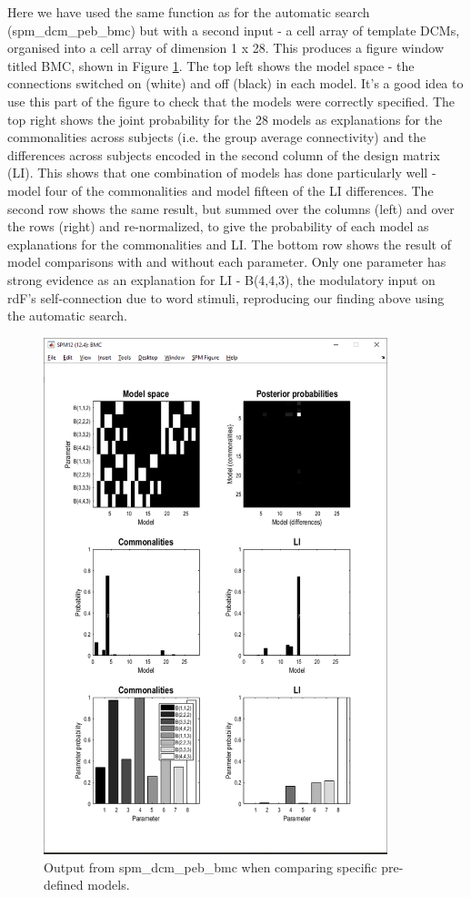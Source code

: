 \documentclass{article}
\begin{document}
Here we have used the same function as for the automatic search (spm\_dcm\_peb\_bmc) but with a second input - a cell array of template DCMs, organised into a cell array of dimension 1 x 28. This produces a figure window titled BMC, shown in Figure \ref{Fig_peb_specific_models_bmc}. The top left shows the model space - the connections switched on (white) and off (black) in each model. It's a good idea to use this part of the figure to check that the models were correctly specified. The top right shows the joint probability for the 28 models as explanations for the commonalities across subjects (i.e. the group average connectivity) and the differences across subjects encoded in the second column of the design matrix (LI). This shows that one combination of models has done particularly well - model four of the commonalities and model fifteen of the LI differences. The second row shows the same result, but summed over the columns (left) and over the rows (right) and re-normalized, to give the probability of each model as explanations for the commonalities and LI. The bottom row shows the result of model comparisons with and without each parameter. Only one parameter has strong evidence as an explanation for LI - B(4,4,3), the modulatory input on rdF's self-connection due to word stimuli, reproducing our finding above using the automatic search.

\begin{figure}[ht]
\begin{center}
\includegraphics[width=10cm]{"Fig_peb_specific_models_bmc"}
\caption{Output from spm\_dcm\_peb\_bmc when comparing specific pre-defined models.\label{Fig_peb_specific_models_bmc}}
\end{center}
\end{figure}
\end{document}
